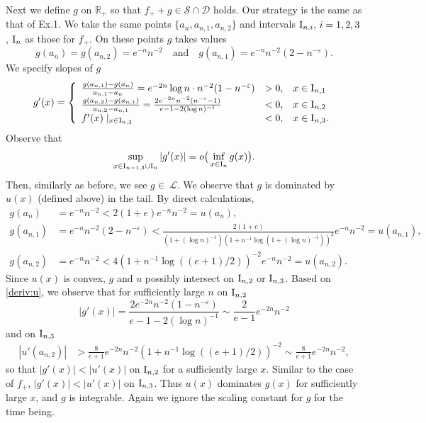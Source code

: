 \documentclass[12pt,leqno]{amsart}
\newcommand{\rI}{{\rm I}}
\newcommand{\R}{\mathbb{R}}
\newcommand{\vep}{\varepsilon}
\newcommand{\cals}{{\mathcal S}}
\newcommand{\call}{{\mathcal L}}
\newcommand{\cald}{{\mathcal D}}
\newcommand{\1}{{\mathbf 1}}
\begin{document}
Next we define $g$ on $\R_+$ so that $f_++g \in \cals \cap \cald$ holds. 
Our strategy is the same as that of Ex.1. We take the same points $\{a_n,a_{n,1},a_{n,2}\}$ and 
intervals $\rI_{n,i},\,i=1,2,3$, $\rI_n$ as those for $f_+$. On these points $g$ takes values 
\[
 g(a_n) = g(a_{n,2}) =e^{-n}n^{-2}\quad \text{and}\quad g(a_{n,1})=e^{-n}n^{-2}(2-n^{-\vep}).
\]
We specify slopes of $g$ 
\begin{align*}
\begin{split}
g'(x)= \left\{
\begin{array}{lll}
\frac{g(a_{n,1})-g(a_{n})}{a_{n,1}-a_{n}}= 
e^{-2n}\log n\cdot n^{-2}(1-n^{-\vep}) & >0, & x\in \rI_{n,1}  \\
\frac{g(a_{n,2})-g(a_{n,1})}{a_{n,2}-a_{n,1}}= \frac{2e^{-2n} n^{-2}(n^{-\vep}-1)}{e-1-2(\log n)^{-1}} & <0, & x\in \rI_{n,2} \\
f'(x) \mid_{x\in\rI_{n,3}} &<0, & x\in \rI_{n,3}.  
\end{array}
\right.
\end{split}
\end{align*}
Observe that 
\[
 \sup_{x\in \rI_{n-1,3}\cup \rI_n}|g'(x)|=o\big(\inf_{x\in \rI_n} g(x)\big).  
\]
Then, similarly as before, we see $g\in\ \call$. We observe that $g$ is dominated by $u(x)$ (defined above) in the tail. 
By direct calculations,  
\begin{align*}
 g(a_n) &= e^{-n}n^{-2} < 2(1+e)e^{-n}n^{-2} = u(a_n), \\
 g(a_{n,1}) &= e^{-n}n^{-2} (2-n^{-\vep}) < \frac{2(1+e)}{(1+(\log n)^{-1})(1+n^{-1} \log(1+(\log n)^{-1}))^2}e^{-n}n^{-2}
=u(a_{n,1}), \\
 g(a_{n,2}) &= e^{-n}n^{-2} < 4 (1+n^{-1} \log ((e+1)/2))^{-2} e^{-n}n^{-2} =u(a_{n,2}). 
\end{align*}
Since $u (x)$ is convex, $g$ and $u$ possibly intersect on $\rI_{n,2}$ or $\rI_{n,3}$. 
Based on \eqref{deriv:u}, we observe that for sufficiently large $n$ on $\rI_{n,2}$
\[
 |g'(x)| = \frac{2 e^{-2n}n^{-2}(1-n^{-\vep})}{e-1-2 (\log n)^{-1}} \sim \frac{2}{e-1} e^{-2n}n^{-2}
\]
and on $\rI_{n,3}$ 
\begin{align*}
 |u'(a_{n,2})| &> \frac{8}{e+1} e^{-2n}n^{-2} (1+n^{-1}\log ((e+1)/2))^{-2} \sim \frac{8}{e+1} e^{-2n}n^{-2},
\end{align*}
so that $|g'(x)| <|u'(x)|$ on $\rI_{n,2}$ for a sufficiently large $x$. 
Similar to the case of $f_+$, $|g'(x)|<|u'(x)|$ on $\rI_{n,3}$. 
Thus $u(x)$ dominates $g(x)$ for sufficiently large $x$, and $g$ is integrable. 
Again we ignore the scaling constant for $g$ for the time being. 
\end{document}
